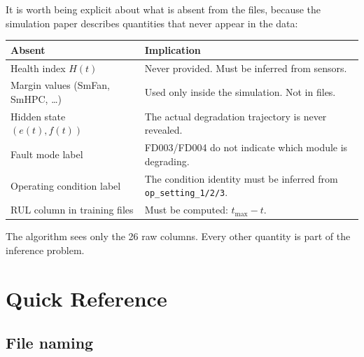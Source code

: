 \documentclass[11pt, a4paper]{article}
\begin{document}
It is worth being explicit about what is absent from the
files, because the simulation paper describes quantities that
never appear in the data:

\begin{center}
\begin{tabular}{@{}lp{7.5cm}@{}}
  \toprule
  Absent & Implication \\
  \midrule
  Health index $H(t)$              &
    Never provided. Must be inferred from sensors. \\
  Margin values (SmFan, SmHPC, \ldots) &
    Used only inside the simulation. Not in files. \\
  Hidden state $(e(t), f(t))$      &
    The actual degradation trajectory is never revealed. \\
  Fault mode label                 &
    FD003/FD004 do not indicate which module is degrading. \\
  Operating condition label        &
    The condition identity must be inferred from
    \texttt{op\_setting\_1/2/3}. \\
  RUL column in training files     &
    Must be computed: $t_{\max} - t$. \\
  \bottomrule
\end{tabular}
\end{center}

The algorithm sees only the 26 raw columns. Every other
quantity is part of the inference problem.

\section{Quick Reference}

\subsection{File naming}
\end{document}
